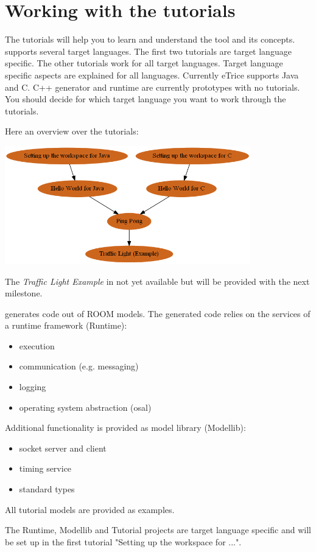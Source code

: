 \section{Working with the tutorials}

The \eTrice{} tutorials will help you to learn and understand the \eTrice{} tool and its concepts. \eTrice{} supports 
several target languages. 
The first two tutorials are target language specific. The other tutorials work for all target languages. Target language specific aspects are explained for all languages. 
Currently eTrice supports Java and C. C++ generator and runtime are currently prototypes with no tutorials. You should decide for which target language you want to work through the tutorials. 

Here an overview over the tutorials:

\includegraphics[width=0.8\textwidth]{images/012-tutorial-structure.png}

The \emph{Traffic Light Example} in not yet available but will be provided with the next \eTrice{} milestone.

\eTrice{} generates code out of ROOM models. The generated code relies on the services of a runtime 
framework (Runtime):
\begin{itemize}
\item execution
\item communication (e.g. messaging)
\item logging
\item operating system abstraction (osal)
\end{itemize}

Additional functionality is provided as model library (Modellib): 
\begin{itemize}
\item socket server and client
\item timing service
\item standard types
\end{itemize}

All tutorial models are provided as examples.
 
The Runtime, Modellib and Tutorial projects are target language specific and will be set up in the first tutorial "Setting up the workspace for ...". 
 